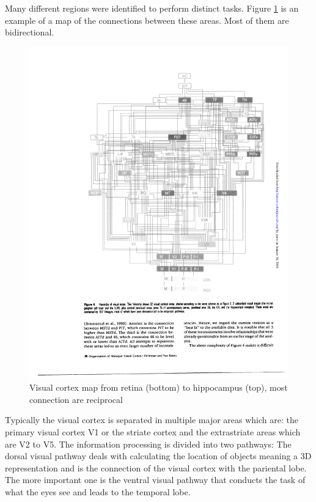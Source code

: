 		Many different regions were identified to perform distinct tasks. Figure \ref{cortex-map} is an example of a map of the connections between these areas. Most of them are bidirectional.

		\begin{figure}[H]
			\centering
			\captionsetup{justification=centering,margin=0.5cm}
			\includegraphics[width=\textwidth, trim=5cm 7cm 2cm 2cm, clip]{images/visual-cortex-map.pdf}
			\caption{Visual cortex map from retina (bottom) to hippocampus (top), most connection are reciprocal \citep{felleman1991distributed}}
			\label{cortex-map}
		\end{figure}
		
		Typically the visual cortex is separated in multiple major areas which are: the primary visual cortex V1 or the striate cortex and the extrastriate areas which are V2 to V5. The information processing is divided into two pathways: The dorsal visual pathway deals with calculating the location of objects meaning a 3D representation and is the connection of the visual cortex with the pariental lobe. The more important one is the ventral visual pathway that conducts the task of what the eyes see and leads to the temporal lobe.
		
